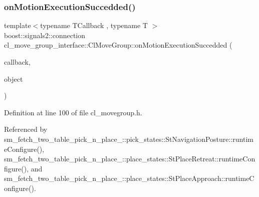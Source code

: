 \subsubsection{\texorpdfstring{on\+Motion\+Execution\+Succedded()}{onMotionExecutionSuccedded()}}
{\footnotesize\ttfamily template$<$typename T\+Callback , typename T $>$ \\
boost\+::signals2\+::connection cl\+\_\+move\+\_\+group\+\_\+interface\+::\+Cl\+Move\+Group\+::on\+Motion\+Execution\+Succedded (\begin{DoxyParamCaption}\item[{T\+Callback}]{callback,  }\item[{T $\ast$}]{object }\end{DoxyParamCaption})\hspace{0.3cm}{\ttfamily [inline]}}



Definition at line 100 of file cl\+\_\+movegroup.\+h.



Referenced by sm\+\_\+fetch\+\_\+two\+\_\+table\+\_\+pick\+\_\+n\+\_\+place\+\_\+::pick\+\_\+states\+::\+St\+Navigation\+Posture\+::runtime\+Configure(), sm\+\_\+fetch\+\_\+two\+\_\+table\+\_\+pick\+\_\+n\+\_\+place\+\_\+::place\+\_\+states\+::\+St\+Place\+Retreat\+::runtime\+Configure(), and sm\+\_\+fetch\+\_\+two\+\_\+table\+\_\+pick\+\_\+n\+\_\+place\+\_\+::place\+\_\+states\+::\+St\+Place\+Approach\+::runtime\+Configure().


